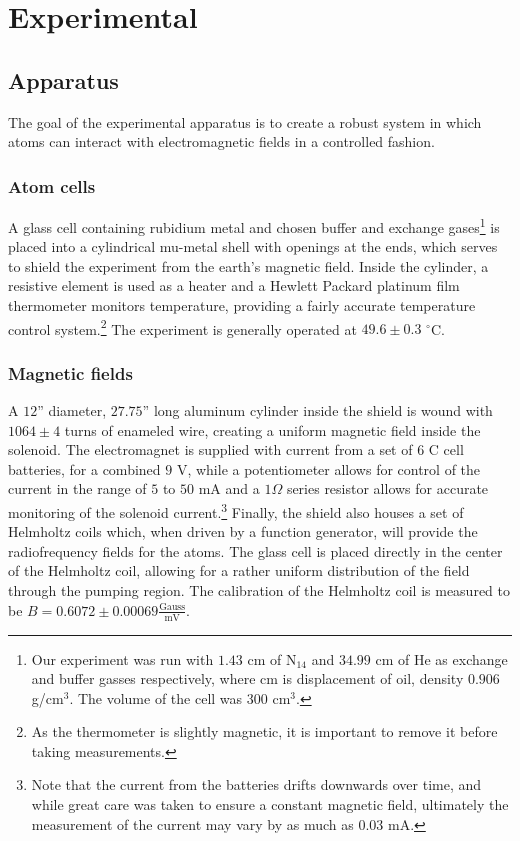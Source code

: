 
\section{Experimental}\label{experimental}

\subsection{Apparatus}\label{apparatus}

The goal of the experimental apparatus is to create a robust system in which atoms can interact with electromagnetic fields in a controlled fashion. 

\subsubsection{Atom cells}
A glass cell containing rubidium metal and chosen buffer and exchange gases\footnote{Our experiment was run with $1.43$ cm of N$_{14}$ and $34.99$ cm of He as exchange and buffer gasses respectively, where cm is displacement of oil, density $0.906$ g/cm$^{3}$. The volume of the cell was $300$ cm$^{3}$.} is placed into a cylindrical mu-metal shell with openings at the ends, which serves to shield the experiment from the earth's magnetic field. Inside the cylinder, a resistive element is used as a heater and a Hewlett Packard platinum film thermometer monitors temperature, providing a fairly accurate temperature control system.\footnote{As the thermometer is slightly magnetic, it is important to remove it before taking measurements.} The experiment is generally operated at $49.6\pm0.3$ $^{\circ}$C.

\subsubsection{Magnetic fields}

A $12$'' diameter, $27.75$'' long aluminum cylinder inside the shield is wound with $1064\pm4$ turns of enameled wire, creating a uniform magnetic field inside the solenoid. The electromagnet is supplied with current from a set of $6$ C cell batteries, for a combined $9$ V, while a potentiometer allows for control of the current in the range of $5$ to $50$ mA and a $1 \Omega$ series resistor allows for accurate monitoring of the solenoid current.\footnote{Note that the current from the batteries drifts downwards over time, and while great care was taken to ensure a constant magnetic field, ultimately the measurement of the current may vary by as much as $0.03$ mA.} Finally, the shield also houses a set of Helmholtz coils which, when driven by a function generator, will provide the radiofrequency fields for the atoms. The glass cell is placed directly in the center of the Helmholtz coil, allowing for a rather uniform distribution of the field through the pumping region. The calibration of the Helmholtz coil is measured to be $B =0.6072\pm0.00069\frac{\mathrm{Gauss}}{\mathrm{mV}}$.

